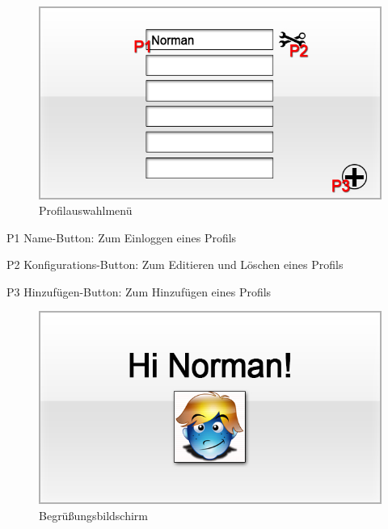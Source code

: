 
\begin{figure}[H]
\centering
\includegraphics[scale=0.55]{../gui/_jpeg_numeration/choose_profile.jpg}
\caption{Profilauswahlmenü}
\label{fig:Profilauswahlmenu}
\end{figure}
\begin{description*}
\item[P1] Name-Button: Zum Einloggen eines Profils
\item[P2] Konfigurations-Button: Zum Editieren und Löschen eines Profils
\item[P3] Hinzufügen-Button: Zum Hinzufügen eines Profils
\end{description*}


\begin{figure}[H]
\centering
\includegraphics[scale=0.55]{../gui/_jpeg_numeration/welcome.jpg}
\caption{Begrüßungsbildschirm}
\label{fig:Begrussungsbildschirm}
\end{figure}

